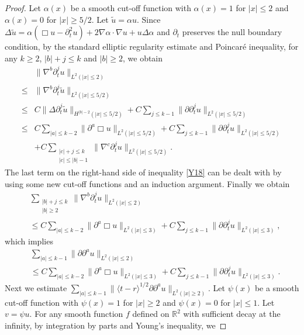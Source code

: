 \documentclass[11pt, reqno]{amsart}
\theoremstyle{definition}
\theoremstyle{remark}
\theoremstyle{definition}
\numberwithin{equation}{section}
\numberwithin{equation}{section}
\def\leq{\leqslant}
\def\geq{\geqslant}
\begin{document}
\begin{proof}
\par Let $\alpha(x)$ be a smooth cut-off function with $\alpha(x)=1$ for
$|x|\leq2$ and $\alpha(x)=0$ for $|x|\geq5/2$. Let $\tilde{u}=\alpha
u$. Since $\Delta \tilde{u}=\alpha(\Box
u-\partial_t^2u)+2\nabla\alpha\cdot\nabla u+u\Delta\alpha$ and
$\partial_t$ preserves the null boundary condition, by the standard
elliptic regularity estimate and Poincar\'{e} inequality, for any
$k\geq2$, $|b|+j\leq k$ and $|b|\geq2$, we obtain
\begin{align}\label{Y18}
&\|\nabla^b
\partial_t^ju\|_{L^2(|x|\leq 2)}
\nonumber\\\leq&\|\nabla^b
\partial_t^j\tilde{u}\|_{L^2(|x|\leq 5/2)}\nonumber\\
\leq&
C\|\Delta\partial_t^j \tilde{u}\|_{H^{|b|-2}(|x|\leq
5/2)}+C\sum_{j\leq k-1}\|\partial
\partial_t^ju\|_{L^2(|x|\leq 5/2)}\nonumber\\
\leq &C\sum_{|a|\leq
k-2}\|\partial^a\Box u\|_{L^2(|x|\leq 5/2)}+C\sum_{j\leq
k-1}\|\partial\partial_t^ju\|_{L^2(|x|\leq 5/2)} \nonumber\\
&+C\sum_{\substack{|c|+j\leq k\\|c|\leq
|b|-1}}\|\nabla^c\partial_t^ju\|_{L^2(|x|\leq 5/2)}.
\end{align}
The last term on the right-hand side of inequality \eqref{Y18} can
be dealt with by using some new cut-off functions and an induction
argument. Finally we obtain
\begin{align*}
&\sum_{\substack{|b|+j\leq k\\|b|\geq2}}\|\nabla^b
\partial_t^ju\|_{L^2(|x|\leq 2)}\\&\leq C\sum_{|a|\leq
k-2}\|\partial^a\Box u\|_{L^2(|x|\leq 3)}+C\sum_{j\leq
k-1}\|\partial\partial_t^ju\|_{L^2(|x|\leq 3)},
\end{align*}
which implies
\begin{align}\label{Y15}
&\sum_{|a|\leq k-1}\|\partial\partial^au\|_{L^2(|x|\leq
2)}\nonumber\\&\leq C\sum_{|a|\leq k-2}\|\partial^a\Box
u\|_{L^2(|x|\leq 3)}+C\sum_{j\leq
k-1}\|\partial\partial_t^ju\|_{L^2(|x|\leq 3)}.
\end{align}
Next we estimate $\sum_{|a|\leq k-1}\|\langle
t-r\rangle^{1/2}\partial\partial^au\|_{L^2(|x|\geq2)}$. Let
$\psi(x)$ be a smooth cut-off function with $\psi(x)=1$ for
$|x|\geq2$ and $\psi(x)=0$ for $|x|\leq1$. Let $v=\psi u$. For any
smooth function $f$ defined on $\mathbb R^2$ with sufficient decay
at the infinity, by integration by parts and Young's inequality, we

\end{proof}
\end{document}
